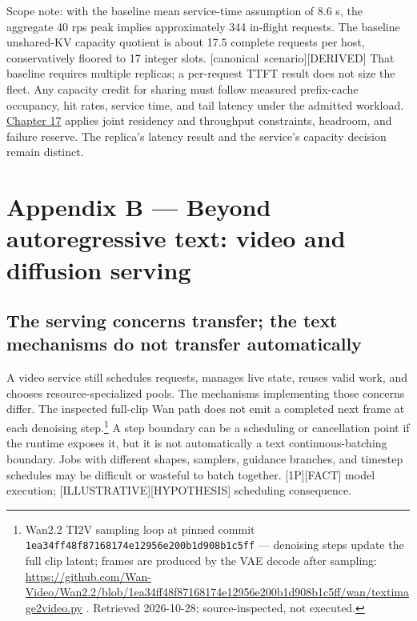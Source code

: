 Scope note: with the baseline mean service-time assumption of 8.6 s, the
aggregate 40 rps peak implies approximately 344 in-flight requests. The
baseline unshared-KV capacity quotient is about 17.5 complete requests
per host, conservatively floored to 17 integer slots. \mbox{{[}canonical
scenario{]}}\hspace{0pt}\mbox{{[}DERIVED{]}} That baseline requires multiple replicas; a
per-request TTFT result does not size the fleet. Any capacity credit for
sharing must follow measured prefix-cache occupancy, hit rates, service
time, and tail latency under the admitted workload. \hyperref[chap:17]{Chapter 17} applies
joint residency and throughput constraints, headroom, and failure
reserve. The replica's latency result and the service's capacity
decision remain distinct.

\section{Appendix B --- Beyond autoregressive text: video and diffusion
serving}\label{appendix-b-beyond-autoregressive-text-video-and-diffusion-serving}

\subsection{The serving concerns transfer; the text mechanisms do not
transfer
automatically}\label{the-serving-concerns-transfer-the-text-mechanisms-do-not-transfer-automatically}

A video service still schedules requests, manages live state, reuses
valid work, and chooses resource-specialized pools. The mechanisms
implementing those concerns differ. The inspected full-clip Wan path
does not emit a completed next frame at each denoising step.\footnote{Wan2.2
  TI2V sampling loop at pinned commit
  \texttt{1ea34ff48f87168174e12956e200b1d908b1c5ff} --- denoising steps
  update the full clip latent; frames are produced by the VAE decode
  after sampling:
  \url{https://github.com/Wan-Video/Wan2.2/blob/1ea34ff48f87168174e12956e200b1d908b1c5ff/wan/textimage2video.py}
  . Retrieved 2026-10-28; source-inspected, not executed.} A step
boundary can be a scheduling or cancellation point if the runtime
exposes it, but it is not automatically a text continuous-batching
boundary. Jobs with different shapes, samplers, guidance branches, and
timestep schedules may be difficult or wasteful to batch together.
\mbox{{[}1P{]}}\hspace{0pt}\mbox{{[}FACT{]}} model execution; \mbox{{[}ILLUSTRATIVE{]}}\hspace{0pt}\mbox{{[}HYPOTHESIS{]}}
scheduling consequence.

